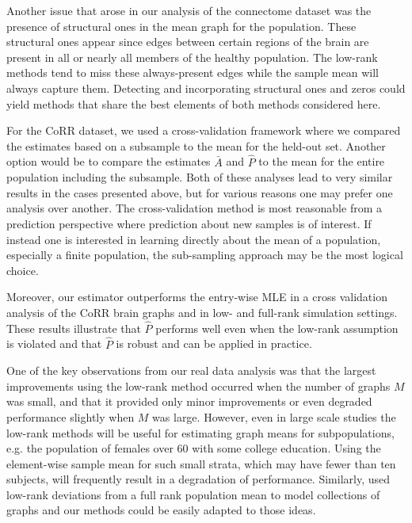 Another issue that arose in our analysis of the connectome dataset was the presence of structural ones in the mean graph for the population. 
These structural ones appear since edges between certain regions of the brain are present in all or nearly all members of the healthy population. 
The low-rank methods tend to miss these always-present edges while the sample mean will always capture them.
Detecting and incorporating structural ones and zeros could yield methods that share the best elements of both methods considered here.

For the CoRR dataset, we used a cross-validation framework where we compared the estimates based on a subsample to the mean for the held-out set. 
Another option would be to compare the estimates $\bar{A}$ and $\hat{P}$ to the mean for the entire population including the subsample.
Both of these analyses lead to very similar results in the cases presented above, but for various reasons one may prefer one analysis over another.
The cross-validation method is most reasonable from a prediction perspective where prediction about new samples is of interest.
If instead one is interested in learning directly about the mean of a population, especially a finite population, the sub-sampling approach may be the most logical choice.







Moreover, our estimator outperforms the entry-wise MLE in a cross validation analysis of the CoRR brain graphs and in low- and full-rank simulation settings.
These results illustrate that $\hat{P}$ performs well even when the low-rank assumption is violated and that $\hat{P}$ is robust and can be applied in practice.

One of the key observations from our real data analysis was that the largest improvements using the low-rank method occurred when the number of graphs $M$ was small, and that it provided only minor improvements or even degraded performance slightly when $M$ was large. 
However, even in large scale studies the low-rank methods will be useful for estimating graph means for subpopulations, e.g. the population of females over 60 with some college education.
Using the element-wise sample mean for such small strata, which may have fewer than ten subjects, will frequently result in a degradation of performance.
Similarly, \citet{durante2014nonparametric} used low-rank deviations from a full rank population mean to model collections of graphs and our methods could be easily adapted to those ideas.




